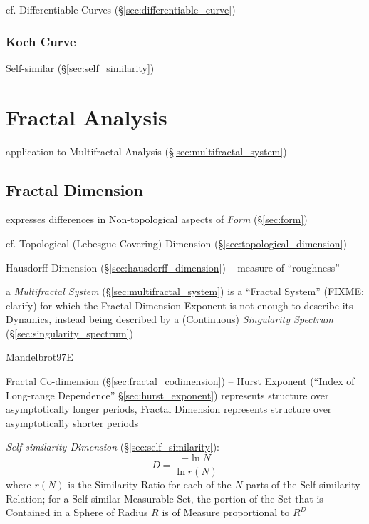 cf. Differentiable Curves (\S\ref{sec:differentiable_curve})



\subsubsection{Koch Curve}\label{sec:koch_curve}

Self-similar (\S\ref{sec:self_similarity})



\section{Fractal Analysis}\label{sec:fractal_analysis}

application to Multifractal Analysis (\S\ref{sec:multifractal_system})



\subsection{Fractal Dimension}\label{sec:fractal_dimension}

expresses differences in Non-topological aspects of \emph{Form}
(\S\ref{sec:form})

cf. Topological (Lebesgue Covering) Dimension
(\S\ref{sec:topological_dimension})

Hausdorff Dimension (\S\ref{sec:hausdorff_dimension}) -- measure of
``roughness''

\fist a \emph{Multifractal System} (\S\ref{sec:multifractal_system}) is a
``Fractal System'' (FIXME: clarify) for which the Fractal Dimension Exponent is
not enough to describe its Dynamics, instead being described by a (Continuous)
\emph{Singularity Spectrum} (\S\ref{sec:singularity_spectrum})

Mandelbrot97E

Fractal Co-dimension (\S\ref{sec:fractal_codimension}) --
Hurst Exponent (``Index of Long-range Dependence'' \S\ref{sec:hurst_exponent})
represents structure over asymptotically longer periods, Fractal Dimension
represents structure over asymptotically shorter periods

\emph{Self-similarity Dimension} (\S\ref{sec:self_similarity}):
\[
  D = \frac{-\ln N}{\ln r(N)}
\]
where $r(N)$ is the Similarity Ratio for each of the $N$ parts of the
Self-similarity Relation;
for a Self-similar Measurable Set, the portion of the Set that is Contained in a
Sphere of Radius $R$ is of Measure proportional to $R^D$

